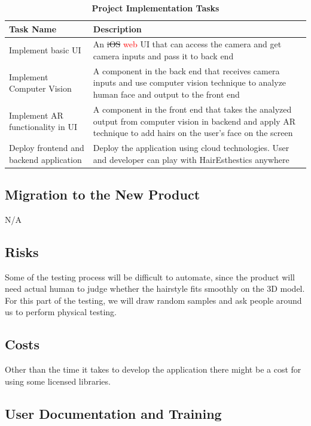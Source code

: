 \documentclass[12pt]{article}
\begin{document}
\begin{flushleft}
\begin{table}[bp hp]
\caption{\bf Project Implementation Tasks}
    \begin{tabularx}{\linewidth}{|l|X|}
        \toprule {\bf Task Name} & {\bf Description}\\
        \midrule
        Implement basic UI & An \sout{iOS} \textcolor{red}{web} UI that can access the camera and get camera inputs and pass it to back end\\
        \hline
        Implement Computer Vision & A component in the back end that receives camera inputs and use computer vision technique to analyze human face and output to the front end\\
        \hline
        Implement AR functionality in UI & A component in the front end that takes the analyzed output from computer vision in backend and apply AR technique to add hairs on the user's face on the screen\\
        \hline
        Deploy frontend and backend application & Deploy the application using cloud technologies. User and developer can play with HairEsthestics anywhere\\
        \bottomrule
    \end{tabularx}
\end{table}
\end{flushleft}
\subsection{Migration to the New Product}
N/A

\subsection{Risks}
Some of the testing process will be difficult to automate, since the product will need actual human to judge whether the hairstyle fits smoothly on the 3D model. For this part of the testing, we will draw random samples and ask people around us to perform physical testing.

\subsection{Costs}

Other than the time it takes to develop the application there might be a cost for using some licensed libraries. 

\subsection{User Documentation and Training}
\end{document}

